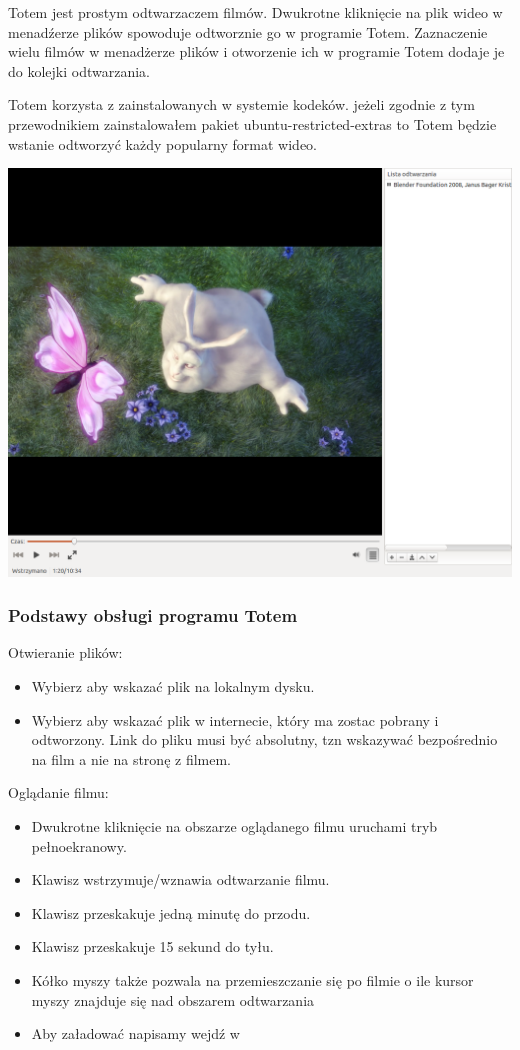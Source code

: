 Totem jest prostym odtwarzaczem filmów. Dwukrotne kliknięcie na plik wideo w menadźerze plików spowoduje odtworznie go w programie Totem. Zaznaczenie wielu filmów w menadżerze plików i otworzenie ich w programie Totem dodaje je do kolejki odtwarzania. 

Totem korzysta z zainstalowanych w systemie kodeków. jeżeli zgodnie z tym przewodnikiem zainstalowałem pakiet \textcolor{ubuntu_orange}{ubuntu-restricted-extras} to Totem będzie wstanie odtworzyć każdy popularny format wideo.
\begin{center}
	\includegraphics[width=\linewidth]{images/programy_totem1.png}
\end{center}

\subsubsection{Podstawy obsługi programu Totem}
Otwieranie plików:
\begin{itemize}
\item Wybierz  aby wskazać plik na lokalnym dysku.
\item Wybierz  aby wskazać plik w internecie, który ma zostac pobrany i odtworzony. Link do pliku musi być absolutny, tzn wskazywać bezpośrednio na film a nie na stronę z filmem.
\end{itemize}
Oglądanie filmu:
\begin{itemize}
\item Dwukrotne kliknięcie na obszarze oglądanego filmu uruchami tryb pełnoekranowy.
\item Klawisz \keys{\Space} wstrzymuje/wznawia odtwarzanie filmu.
\item Klawisz \keys{\arrowkeyright} przeskakuje jedną minutę do przodu.
\item Klawisz \keys{\arrowkeyleft} przeskakuje 15 sekund do tyłu.
\item Kółko myszy także pozwala na przemieszczanie się po filmie o ile kursor myszy znajduje się nad obszarem odtwarzania
\item Aby załadować napisamy wejdź w 
\end{itemize}